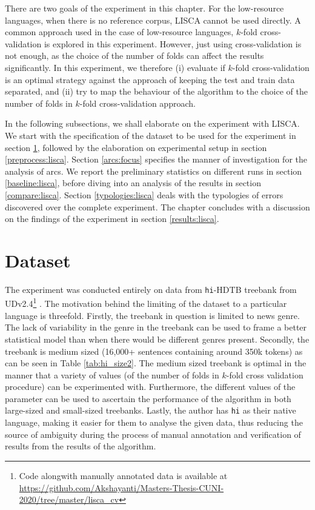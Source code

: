 There are two goals of the experiment in this chapter. For the low-resource languages, when there is no reference corpus, LISCA cannot be used directly. A common approach used in the case of low-resource languages, $k$-fold cross-validation is explored in this experiment. However, just using cross-validation is not enough, as the choice of the number of folds can affect the results significantly. In this experiment, we therefore (i) evaluate if $k$-fold cross-validation is an optimal strategy against the approach of keeping the test and train data separated, and (ii) try to map the behaviour of the algorithm to the choice of the number of folds in $k$-fold cross-validation approach.

In the following subsections, we shall elaborate on the experiment with LISCA. We start with the specification of the dataset to be used for the experiment in section \ref{data:lisca}, followed by the elaboration on experimental setup in section \ref{preprocess:lisca}. Section \ref{arcs:focus} specifies the manner of investigation for the analysis of arcs. We report the preliminary statistics on different runs in section \ref{baseline:lisca}, before diving into an analysis of the results in section \ref{compare:lisca}. Section \ref{typologies:lisca} deals with the typologies of errors discovered over the complete experiment. The chapter concludes with a discussion on the findings of the experiment in section \ref{results:lisca}.

\section{Dataset}
\label{data:lisca}

The experiment was conducted entirely on data from \verb|hi|-HDTB treebank from UDv2.4\footnote{Code alongwith manually annotated data is available at \url{https://github.com/Akshayanti/Masters-Thesis-CUNI-2020/tree/master/lisca_cv}} \citep{UDv2.4}. The motivation behind the limiting of the dataset to a particular language is threefold. Firstly, the treebank in question is limited to news genre. The lack of variability in the genre in the treebank can be used to frame a better statistical model than when there would be different genres present. Secondly, the treebank is medium sized (16,000+ sentences containing around 350k tokens) as can be seen in Table \ref{tab:hi_size2}. The medium sized treebank is optimal in the manner that a variety of values (of the number of folds in $k$-fold cross validation procedure) can be experimented with. Furthermore, the different values of the parameter can be used to ascertain the performance of the algorithm in both large-sized and small-sized treebanks. Lastly, the author has \verb|hi| as their native language, making it easier for them to analyse the given data, thus reducing the source of ambiguity during the process of manual annotation and verification of results from the results of the algorithm.

